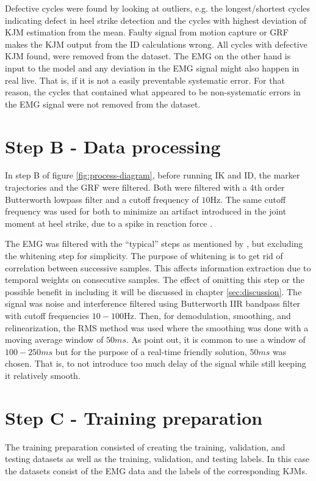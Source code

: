 \documentclass[../main.tex]{subfiles}
\begin{document}
Defective cycles were found by looking at outliers, e.g. the longest/shortest cycles indicating defect in heel strike detection and the cycles with highest deviation of \ac{KJM} estimation from the mean.
Faulty signal from motion capture or \ac{GRF} makes the \ac{KJM} output from the \ac{ID} calculations wrong.
All cycles with defective \ac{KJM} found, were removed from the dataset.
The \ac{EMG} on the other hand is input to the model and any deviation in the \ac{EMG} signal might also happen in real live.
That is, if it is not a easily preventable systematic error.
For that reason, the cycles that contained what appeared to be non-systematic errors in the \ac{EMG} signal were not removed from the dataset.

\section{Step B - Data processing}
\label{sec:data-processing}
In step B of figure \ref{fig:process-diagram}, before running \ac{IK} and \ac{ID}, the marker trajectories and the \ac{GRF} were filtered.
Both were filtered with a 4th order Butterworth lowpass filter and a cutoff frequency of $10$Hz. 
The same cutoff frequency was used for both to minimize an artifact introduced in the joint moment at heel strike, due to a spike in reaction force \cite{Kristianslund2012}.

The \ac{EMG} was filtered with the ``typical'' steps as mentioned by \textcite[99]{Clancy2016}, but excluding the whitening step for simplicity.
The purpose of whitening is to get rid of correlation between successive samples.
This affects information extraction due to temporal weights on consecutive samples.
The effect of omitting this step or the possible benefit in including it will be discussed in chapter \ref{sec:discussion}.
The signal was noise and interference filtered using Butterworth IIR bandpass filter with cutoff frequencies $10-100$Hz. 
Then, for demodulation, smoothing, and relinearization, the RMS method was used where the smoothing was done with a moving average window of $50ms$. 
As \textcite{Clancy2016} point out, it is common to use a window of $100-250 ms$ but for the purpose of a real-time friendly solution, $50ms$ was chosen.
That is, to not introduce too much delay of the signal while still keeping it relatively smooth.

\section{Step C - Training preparation}
The training preparation consisted of creating the training, validation, and testing datasets as well as the training, validation, and testing labels.
In this case the datasets consist of the \ac{EMG} data and the labels of the corresponding \acp{KJM}.
\end{document}
